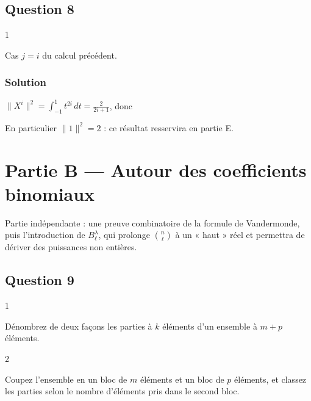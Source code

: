 \documentclass[11pt,a4paper]{article}
\newcommand{\equationajustee}[1]{%
  \sbox{\boiteequation}{$\displaystyle #1$}%
  \ifdim\wd\boiteequation>\linewidth
    \[\resizebox{\linewidth}{!}{\usebox{\boiteequation}}\]%
  \else
    \[#1\]%
  \fi}
\begin{document}
\hypertarget{question-8}{%
\subsection{Question 8}\label{question-8}}

\begin{indication}{1}

Cas \(j=i\) du calcul précédent.

\end{indication}

\hypertarget{solution-7}{%
\subsubsection{Solution}\label{solution-7}}

\(\|X^i\|^2=\displaystyle\int_{-1}^1t^{2i}\,dt=\frac2{2i+1}\), donc

\equationajustee{\|X^i\|=\sqrt{\frac2{2i+1}}.}

En particulier \(\|1\|^2=2\) : ce résultat resservira en partie E.

\hypertarget{partie-b-autour-des-coefficients-binomiaux}{%
\section{Partie B --- Autour des coefficients binomiaux}\label{partie-b-autour-des-coefficients-binomiaux}}

Partie indépendante : une preuve combinatoire de la formule de Vandermonde, puis l'introduction de \(B^\lambda_\ell\), qui prolonge \(\binom{n}{\ell}\) à un « haut » réel et permettra de dériver des puissances non entières.

\hypertarget{question-9}{%
\subsection{Question 9}\label{question-9}}

\begin{indication}{1}

Dénombrez de deux façons les parties à \(k\) éléments d'un ensemble à \(m+p\) éléments.

\end{indication}

\begin{indication}{2}

Coupez l'ensemble en un bloc de \(m\) éléments et un bloc de \(p\) éléments, et classez les parties selon le nombre d'éléments pris dans le second bloc.

\end{indication}
\end{document}

